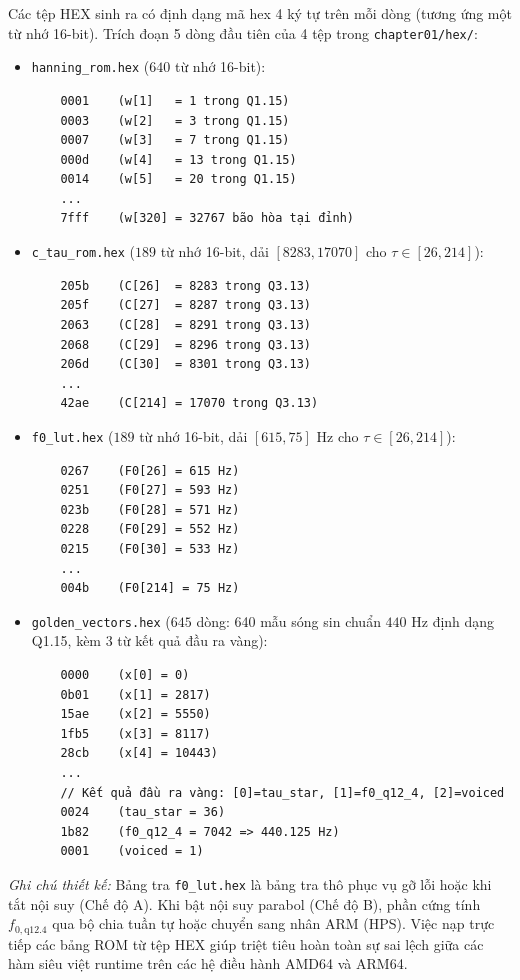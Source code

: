 \documentclass[11pt,a4paper]{article}
\begin{document}
Các tệp HEX sinh ra có định dạng mã hex 4 ký tự trên mỗi dòng (tương ứng một từ nhớ 16-bit). Trích đoạn 5 dòng đầu tiên của 4 tệp trong \texttt{chapter01/hex/}:
\begin{itemize}
    \setlength{\itemsep}{1pt}
    \item \texttt{hanning\_rom.hex} ($640$ từ nhớ 16-bit):
    \begin{verbatim}
    0001    (w[1]   = 1 trong Q1.15)
    0003    (w[2]   = 3 trong Q1.15)
    0007    (w[3]   = 7 trong Q1.15)
    000d    (w[4]   = 13 trong Q1.15)
    0014    (w[5]   = 20 trong Q1.15)
    ...
    7fff    (w[320] = 32767 bão hòa tại đỉnh)
    \end{verbatim}
    \item \texttt{c\_tau\_rom.hex} ($189$ từ nhớ 16-bit, dải $[8283, 17070]$ cho $\tau \in [26, 214]$):
    \begin{verbatim}
    205b    (C[26]  = 8283 trong Q3.13)
    205f    (C[27]  = 8287 trong Q3.13)
    2063    (C[28]  = 8291 trong Q3.13)
    2068    (C[29]  = 8296 trong Q3.13)
    206d    (C[30]  = 8301 trong Q3.13)
    ...
    42ae    (C[214] = 17070 trong Q3.13)
    \end{verbatim}
    \item \texttt{f0\_lut.hex} ($189$ từ nhớ 16-bit, dải $[615, 75]\text{ Hz}$ cho $\tau \in [26, 214]$):
    \begin{verbatim}
    0267    (F0[26] = 615 Hz)
    0251    (F0[27] = 593 Hz)
    023b    (F0[28] = 571 Hz)
    0228    (F0[29] = 552 Hz)
    0215    (F0[30] = 533 Hz)
    ...
    004b    (F0[214] = 75 Hz)
    \end{verbatim}
    \item \texttt{golden\_vectors.hex} ($645$ dòng: 640 mẫu sóng sin chuẩn $440\text{ Hz}$ định dạng Q1.15, kèm 3 từ kết quả đầu ra vàng):
    \begin{verbatim}
    0000    (x[0] = 0)
    0b01    (x[1] = 2817)
    15ae    (x[2] = 5550)
    1fb5    (x[3] = 8117)
    28cb    (x[4] = 10443)
    ...
    // Kết quả đầu ra vàng: [0]=tau_star, [1]=f0_q12_4, [2]=voiced
    0024    (tau_star = 36)
    1b82    (f0_q12_4 = 7042 => 440.125 Hz)
    0001    (voiced = 1)
    \end{verbatim}
\end{itemize}

\textit{Ghi chú thiết kế:} Bảng tra \texttt{f0\_lut.hex} là bảng tra thô phục vụ gỡ lỗi hoặc khi tắt nội suy (Chế độ A). Khi bật nội suy parabol (Chế độ B), phần cứng tính $f_{0,\text{q12.4}}$ qua bộ chia tuần tự hoặc chuyển sang nhân ARM (HPS). Việc nạp trực tiếp các bảng ROM từ tệp HEX giúp triệt tiêu hoàn toàn sự sai lệch giữa các hàm siêu việt runtime trên các hệ điều hành AMD64 và ARM64.
\end{document}

